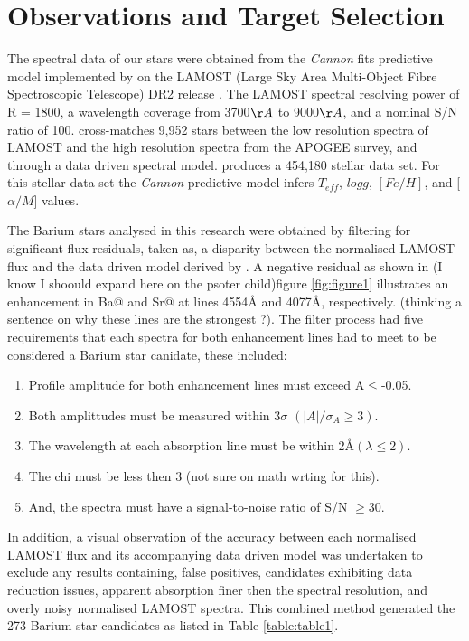\documentclass[a4paper,fleqn,usenatbib]{mnras}
\makeatletter
\newcommand{\Rmnum}[1]{\expandafter\@slowromancap\romannumeral #1@}
\makeatother
\begin{document}
\section{Observations and Target Selection}
The spectral data of our stars were obtained from the \textit{Cannon} fits predictive model implemented by \citet{ho2017} on the LAMOST (Large Sky Area Multi-Object Fibre Spectroscopic Telescope) DR2 release \citep{luo2015}. The LAMOST spectral resolving power of R = 1800, a wavelength coverage from 3700$\AA$ to 9000$\AA$, and a nominal S/N ratio of 100. \citet{ho2017} cross-matches 9,952 stars between the low resolution spectra of LAMOST and the high resolution spectra from the APOGEE survey, and through a data driven spectral model. produces a 454,180 stellar data set. For this stellar data set the \textit{Cannon} predictive model infers $T_{eff}$, $log g$, $[Fe/H]$, and [$\alpha/M$] values.

The Barium stars analysed in this research were obtained by filtering for significant flux residuals, taken as, a disparity between the normalised LAMOST flux and the data driven model derived by \citet{ho2017}. A negative residual as shown in (I know I shoould expand here on the psoter child)figure \ref{fig:figure1} illustrates an enhancement in Ba\Rmnum{2} and Sr\Rmnum{2} at lines 4554\AA \hspace{0.2mm} and 4077\AA, respectively. (thinking a sentence on why these lines are the strongest ?). The filter process had five requirements that each spectra for both enhancement lines had to meet to be considered a Barium star canidate, these included:

\renewcommand\labelenumi{(\roman{enumi})}
\renewcommand\theenumi\labelenumi

\begin{enumerate} 
\item Profile amplitude for both enhancement lines must exceed A$\leq$-0.05.
\item Both amplittudes must be measured within 3$\sigma$ $(|A|/\sigma _A \geq 3)$.
\item The wavelength at each absorption line must be within $2$\AA \hspace{0.2mm}$(\lambda \leq 2)$.
\item The chi must be less then 3 (not sure on math wrting for this).
\item And, the spectra must have a signal-to-noise ratio of S/N $\geq 30$.
\end{enumerate}
In addition, a visual observation of the accuracy between each normalised LAMOST flux and its accompanying data driven model was undertaken to exclude any results containing, false positives, candidates exhibiting data reduction issues, apparent absorption finer then the spectral resolution, and overly noisy normalised LAMOST spectra. This combined method generated the 273 Barium star candidates as listed in Table \ref{table:table1}. 
\end{document}
